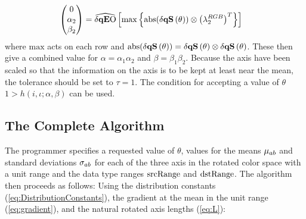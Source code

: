 \begin{align*}
 \begin{pmatrix}  0   \\   \alpha_2   \\  \beta_2   \\ \end{pmatrix}     &=  
\dqEO\left[  
\max \left\{\text{abs}(\dqs[\theta]) \otimes \left(\discard^{RGB}_2 \right)^T \right\}
\right]
\end{align*}
where $\text{max}$ acts on each row and $\text{abs}(\dqs[\theta])  = \dqs[\theta] \otimes \dqs[\theta]$. 
These then give a combined value for $\alpha = \alpha_1 \alpha_2$ and $\beta = \beta_1 \beta_2$. Because the axis have been scaled so that the information on the axis is to be kept at least near the mean, the tolerance should be set to $\tau =1$. The condition for accepting a value of $\theta$ $1 > h(i,\iota; \alpha,\beta)$ can be used.

\subsection{The Complete Algorithm}


The programmer specifies a requested value of $\theta$, values for the means $\mu_{ab}$ and standard deviations $\sigma_ {ab}$ for each of the three axis in the rotated color space with a unit range and the data type ranges $\text{srcRange}$ and $\text{dstRange}$. The algorithm then proceeds as follows:
\newline
{} 
Using the distribution constants (\ref{eq:DistributionConstants}), the gradient at the mean in the unit range (\ref{eq:gradient}), and the natural rotated axis lengths (\ref{eq:L}):


